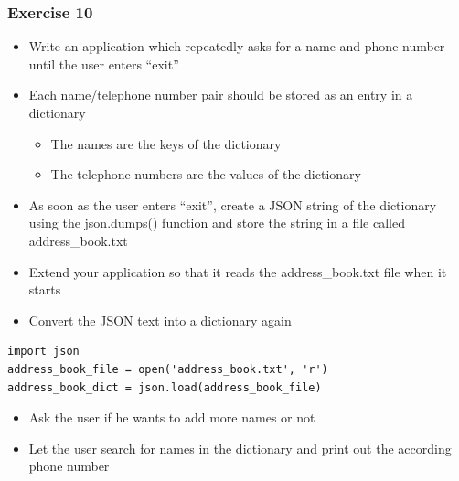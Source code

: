 \documentclass[10pt, a4paper]{beamer} %
\begin{document}
{\begin{frame}\frametitle{Exercise 10}

    \begin{itemize}
        \item Write an application which repeatedly asks for a name and phone
              number until the user enters ``exit''
        \item Each name/telephone number pair should be stored as an entry in a dictionary
              \begin{itemize}
                  \item The names are the keys of the dictionary
                  \item The telephone numbers are the values of the dictionary
              \end{itemize}
        \item As soon as the user enters ``exit'', create a JSON string of the dictionary using the json.dumps() function and store the string in a file called address\_book.txt
    \end{itemize}

    \framebreak

    \begin{itemize}
        \item Extend your application so that it reads the address\_book.txt file when it starts
        \item Convert the JSON text into a dictionary again
    \end{itemize}

    {
    \mdseries
    \begin{lstlisting}
import json
address_book_file = open('address_book.txt', 'r')
address_book_dict = json.load(address_book_file)
\end{lstlisting}
    }

    \begin{itemize}
        \item Ask the user if he wants to add more names or not
        \item Let the user search for names in the dictionary and print out the according phone number
    \end{itemize}

\end{frame}
}
\end{document}
